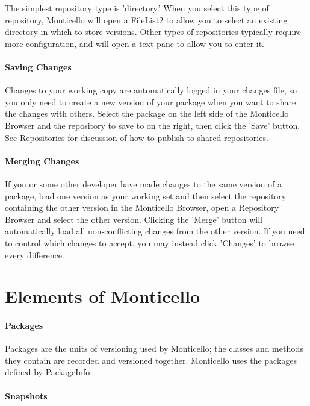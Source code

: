 \documentclass[a4paper,10pt,twoside]{book}
\begin{document}
The simplest repository type is 'directory.' When you select this type of repository, Monticello will open a FileList2 to allow you to select an existing directory in which to store versions. Other types of repositories typically require more configuration, and will open a text pane to allow you to enter it.

\paragraph{Saving Changes}

Changes to your working copy are automatically logged in your changes file, so you only need to create a new version of your package when you want to share the changes with others. Select the package on the left side of the Monticello Browser and the repository to save to on the right, then click the 'Save' button. See Repositories for discussion of how to publish to shared repositories.

\paragraph{Merging Changes}

If you or some other developer have made changes to the same version of a package, load one version as your working set and then select the repository containing the other version in the Monticello Browser, open a Repository Browser and select the other version. Clicking the 'Merge' button will automatically load all non-conflicting changes from the other version. If you need to control which changes to accept, you may instead click 'Changes' to browse every difference.



\section{Elements of Monticello}

\paragraph{Packages}

Packages are the units of versioning used by Monticello; the classes and methods they contain are recorded and versioned together. Monticello uses the packages defined by PackageInfo.

\paragraph{Snapshots}
\end{document}
